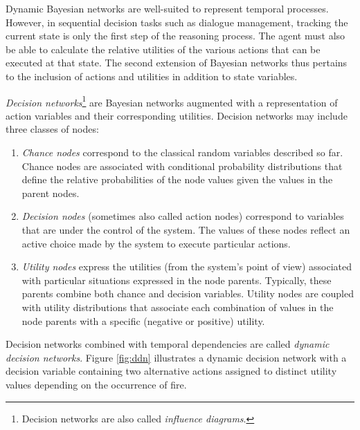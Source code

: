 Dynamic Bayesian networks are well-suited to represent temporal processes.  However, in sequential decision tasks such as dialogue management, tracking the current state is only the first step of the reasoning process. The agent must also be able to calculate the relative utilities of the various actions that can be executed at that  state. The second extension of Bayesian networks thus pertains to the inclusion of actions and utilities in addition to state variables.  

\textit{Decision networks}\footnote{Decision networks are also called \textit{influence diagrams}.} are Bayesian networks augmented with a representation of action variables and their corresponding utilities. Decision networks may include three classes of nodes:
\begin{enumerate}
\item \textit{Chance nodes} correspond to the classical random variables described so far.  Chance nodes are associated with conditional probability distributions that define the relative probabilities of the node values given the values in the parent nodes.
\item \textit{Decision nodes} (sometimes also called action nodes) correspond to variables that are under the control of the system.  The values of these nodes reflect an active choice made by the system to execute particular actions.
\item \textit{Utility nodes} express the utilities (from the system's point of view) associated with particular situations expressed in the node parents.  Typically, these parents combine both chance and decision variables.   Utility nodes are coupled with utility distributions that associate each combination of values in the node parents with a specific (negative or positive) utility. 
\end{enumerate}

Decision networks combined with temporal dependencies are called \textit{dynamic decision networks}.  Figure \ref{fig:ddn} illustrates a dynamic decision network with a decision variable containing two alternative actions assigned to distinct utility values depending on the occurrence of fire. 

 
